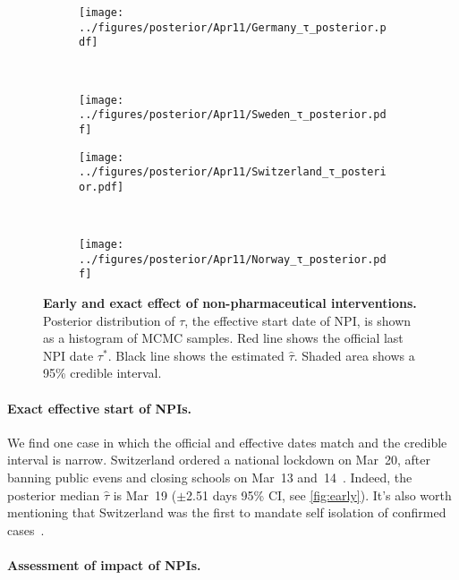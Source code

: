 \documentclass[12pt]{extarticle}
\begin{document}
\begin{figure}[h]
    \centering
    \begin{subfigure}{0.45\textwidth}
        \texttt{[image: ../figures/posterior/Apr11/Germany\_τ\_posterior.pdf]}
    \end{subfigure}
    ~
    \begin{subfigure}{0.45\textwidth}
		\texttt{[image: ../figures/posterior/Apr11/Sweden\_τ\_posterior.pdf]}
    \end{subfigure}
    
	\begin{subfigure}{0.45\textwidth}
        \texttt{[image: ../figures/posterior/Apr11/Switzerland\_τ\_posterior.pdf]}
    \end{subfigure}
    ~
    \begin{subfigure}{0.45\textwidth}
		\texttt{[image: ../figures/posterior/Apr11/Norway\_τ\_posterior.pdf]}
    \end{subfigure}
    \caption{
    \textbf{Early and exact effect of non-pharmaceutical interventions.}
    Posterior distribution of $\tau$, the effective start date of NPI, is shown as a histogram of MCMC samples. Red line shows the official last NPI date $\tau^*$. Black line shows the estimated $\hat{\tau}$. Shaded area shows a 95\% credible interval. 
	}
	\label{fig:early}
\end{figure}


\paragraph*{Exact effective start of NPIs.}
We find one case in which the official and effective dates match and the credible interval is narrow.
Switzerland ordered a national lockdown on Mar~20, after banning public evens and closing schools on Mar~13 and~14~\citep{Flaxman2020}.
Indeed, the posterior median $\hat{\tau}$ is Mar~19 ($\pm$2.51 days 95\% CI, see \autoref{fig:early}). It's also worth mentioning that Switzerland was the first to mandate self isolation of confirmed cases~\citep{Flaxman2020}.



\paragraph*{Assessment of impact of NPIs.}
\end{document}
